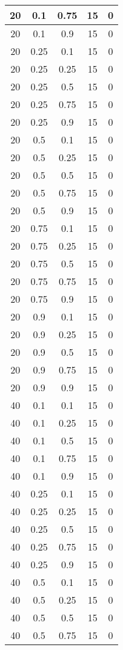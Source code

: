 \documentclass{bmstu}
\begin{document}
\begin{center}
\begin{longtable}[c]{|c|c|c|c|c|}
20 & 0.1 & 0.75 & 15 & 0 \\\hline
20 & 0.1 & 0.9 & 15 & 0 \\\hline
20 & 0.25 & 0.1 & 15 & 0 \\\hline
20 & 0.25 & 0.25 & 15 & 0 \\\hline
20 & 0.25 & 0.5 & 15 & 0 \\\hline
20 & 0.25 & 0.75 & 15 & 0 \\\hline
20 & 0.25 & 0.9 & 15 & 0 \\\hline
20 & 0.5 & 0.1 & 15 & 0 \\\hline
20 & 0.5 & 0.25 & 15 & 0 \\\hline
20 & 0.5 & 0.5 & 15 & 0 \\\hline
20 & 0.5 & 0.75 & 15 & 0 \\\hline
20 & 0.5 & 0.9 & 15 & 0 \\\hline
20 & 0.75 & 0.1 & 15 & 0 \\\hline
20 & 0.75 & 0.25 & 15 & 0 \\\hline
20 & 0.75 & 0.5 & 15 & 0 \\\hline
20 & 0.75 & 0.75 & 15 & 0 \\\hline
20 & 0.75 & 0.9 & 15 & 0 \\\hline
20 & 0.9 & 0.1 & 15 & 0 \\\hline
20 & 0.9 & 0.25 & 15 & 0 \\\hline
20 & 0.9 & 0.5 & 15 & 0 \\\hline
20 & 0.9 & 0.75 & 15 & 0 \\\hline
20 & 0.9 & 0.9 & 15 & 0 \\\hline
40 & 0.1 & 0.1 & 15 & 0 \\\hline
40 & 0.1 & 0.25 & 15 & 0 \\\hline
40 & 0.1 & 0.5 & 15 & 0 \\\hline
40 & 0.1 & 0.75 & 15 & 0 \\\hline
40 & 0.1 & 0.9 & 15 & 0 \\\hline
40 & 0.25 & 0.1 & 15 & 0 \\\hline
40 & 0.25 & 0.25 & 15 & 0 \\\hline
40 & 0.25 & 0.5 & 15 & 0 \\\hline
40 & 0.25 & 0.75 & 15 & 0 \\\hline
40 & 0.25 & 0.9 & 15 & 0 \\\hline
40 & 0.5 & 0.1 & 15 & 0 \\\hline
40 & 0.5 & 0.25 & 15 & 0 \\\hline
40 & 0.5 & 0.5 & 15 & 0 \\\hline
40 & 0.5 & 0.75 & 15 & 0 \\\hline

\end{longtable}
\end{center}
\end{document}

